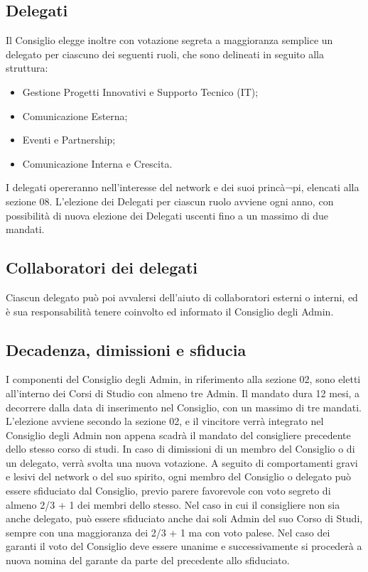 \subsection{Delegati}

Il Consiglio elegge inoltre con votazione segreta a maggioranza semplice un delegato per ciascuno dei seguenti ruoli, che sono delineati in seguito alla struttura:

\begin{itemize}


\item Gestione Progetti Innovativi e Supporto Tecnico (IT);
\item Comunicazione Esterna;
\item Eventi e Partnership;
\item Comunicazione Interna e Crescita.
\end{itemize}

I delegati opereranno nell'interesse del network e dei suoi princà¬pi, elencati alla sezione 08. L'elezione dei Delegati per ciascun ruolo avviene ogni anno, con possibilità di nuova elezione dei Delegati uscenti fino a un massimo di due mandati.



\subsection{Collaboratori dei delegati}
Ciascun delegato può poi avvalersi dell'aiuto di collaboratori esterni o interni, ed è sua responsabilità tenere coinvolto ed informato il Consiglio degli Admin.



\subsection{Decadenza, dimissioni e sfiducia}

I componenti del Consiglio degli Admin, in riferimento alla sezione 02, sono eletti all'interno dei Corsi di Studio con almeno tre Admin. Il mandato dura 12 mesi, a decorrere dalla data di inserimento nel Consiglio, con un massimo di tre mandati. L'elezione avviene secondo la sezione 02, e il vincitore verrà integrato nel Consiglio degli Admin non appena scadrà il mandato del consigliere precedente dello stesso corso di studi.
In caso di dimissioni di un membro del Consiglio o di un delegato, verrà svolta una nuova votazione. A seguito di comportamenti gravi e lesivi del network o del suo spirito, ogni membro del Consiglio o delegato può essere sfiduciato dal Consiglio, previo parere favorevole con voto segreto di almeno 2/3 + 1 dei membri dello stesso. Nel caso in cui il consigliere non sia anche delegato, può essere sfiduciato anche dai soli Admin del suo Corso di Studi, sempre con una maggioranza dei 2/3 + 1 ma con voto palese. Nel caso dei garanti il voto del Consiglio deve essere unanime e successivamente si procederà a nuova nomina del garante da parte del precedente allo sfiduciato.

